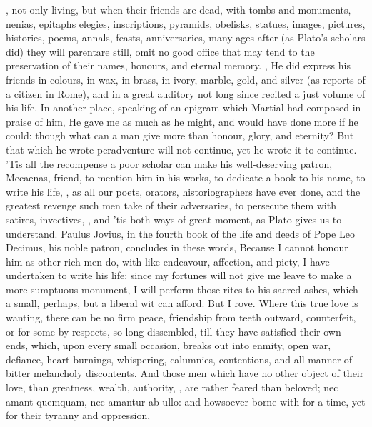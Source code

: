 {, not only living, but when
their friends are dead, with tombs and monuments, nenias, epitaphs
elegies, inscriptions, pyramids, obelisks, statues, images, pictures,
histories, poems, annals, feasts, anniversaries, many ages after (as
Plato's scholars did) they will parentare still, omit no good office
that may tend to the preservation of their names, honours, and eternal
memory. , \etc{} He did
express his friends in colours, in wax, in brass, in ivory, marble,
gold, and silver (as \Pliny{} reports of a citizen in Rome), and in a
great auditory not long since recited a just volume of his life. In
another place, speaking of an epigram which Martial had composed
in praise of him, He gave me as much as he might, and would have
done more if he could: though what can a man give more than honour,
glory, and eternity? But that which he wrote peradventure will not
continue, yet he wrote it to continue. 'Tis all the recompense a poor
scholar can make his well-deserving patron, Mecaenas, friend, to
mention him in his works, to dedicate a book to his name, to write his
life, \etc{}, as all our poets, orators, historiographers have ever done,
and the greatest revenge such men take of their adversaries, to
persecute them with satires, invectives, \etc{}, and 'tis both ways of
great moment, as  Plato gives us to understand. Paulus Jovius, in
the fourth book of the life and deeds of Pope Leo Decimus, his noble
patron, concludes in these words, Because I cannot honour him as
other rich men do, with like endeavour, affection, and piety, I have
undertaken to write his life; since my fortunes will not give me leave
to make a more sumptuous monument, I will perform those rites to his
sacred ashes, which a small, perhaps, but a liberal wit can afford. But
I rove. Where this true love is wanting, there can be no firm peace,
friendship from teeth outward, counterfeit, or for some by-respects, so
long dissembled, till they have satisfied their own ends, which, upon
every small occasion, breaks out into enmity, open war, defiance,
heart-burnings, whispering, calumnies, contentions, and all manner of
bitter melancholy discontents. And those men which have no other object
of their love, than greatness, wealth, authority, \etc{}, are rather
feared than beloved; nec amant quemquam, nec amantur ab ullo: and
howsoever borne with for a time, yet for their tyranny and oppression,
}
